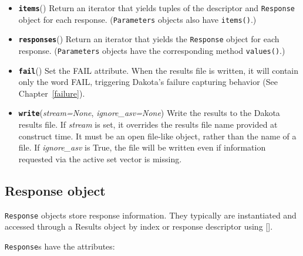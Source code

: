 \begin{itemize}
  \item{}
	  \label{index:dakota.interfacing.Results.items}\textbf{\texttt{items}}{()}{}
          Return an iterator that yields tuples of the descriptor and {\tt Response} object for each response. ({\tt Parameters} objects also have {\tt items()}.)

  \item{}
	  \label{index:dakota.interfacing.Results.responses}\textbf{\texttt{responses}}{()}{}
          Return an iterator that yields the {\tt Response} object for each response. ({\tt Parameters} objects have the corresponding method {\tt values()}.)

  \item{}
	  \label{index:dakota.interfacing.Results.fail}\textbf{\texttt{fail}}{()}{}
	  Set the FAIL attribute. When the results file is written, it will contain only the word FAIL, triggering Dakota's failure capturing behavior (See Chapter~\ref{failure}).

\item {}
	\label{index:dakota.interfacing.Results.write}\textbf{\texttt{write}}({\emph{stream=None}, \emph{ignore\_asv=None}}){}
Write the results to the Dakota results file. If \emph{stream} is set, it overrides the results file name provided at construct time. It must be an open file-like object, rather than the name of a file. If \emph{ignore\_asv} is True, the file will be written even if information requested via the active set vector is missing.

\end{itemize}

\subsection{Response object}

{\tt Response} objects store response information. They typically are instantiated and accessed through a Results object by index or response descriptor using {[}{]}.

{\tt Response}s have the attributes:

